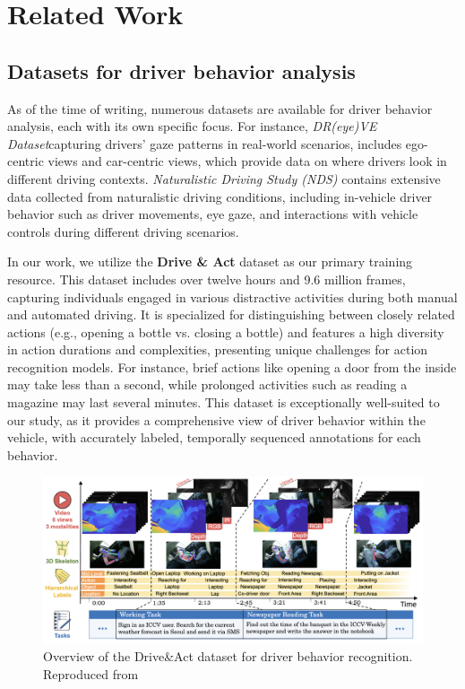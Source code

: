 \chapter{Related Work}\label{chapter:relatedwork}

\section{Datasets for driver behavior analysis}

As of the time of writing, numerous datasets are available for driver behavior analysis, each with its own specific focus. For instance, \textit{DR(eye)VE Dataset}\cite{palazzi2018predicting}capturing drivers' gaze patterns in real-world scenarios, includes ego-centric views and car-centric views, which provide data on where drivers look in different driving contexts. \textit{Naturalistic Driving Study (NDS)}\cite{regan2012naturalistic} contains extensive data collected from naturalistic driving conditions, including in-vehicle driver behavior such as driver movements, eye gaze, and interactions with vehicle controls during different driving scenarios.


In our work, we utilize the \textbf{Drive \& Act} dataset\cite{9009583} as our primary training resource. This dataset includes over twelve hours and 9.6 million frames, capturing individuals engaged in various distractive activities during both manual and automated driving. It is specialized for distinguishing between closely related actions (e.g., opening a bottle vs. closing a bottle) and features a high diversity in action durations and complexities, presenting unique challenges for action recognition models. For instance, brief actions like opening a door from the inside may take less than a second, while prolonged activities such as reading a magazine may last several minutes. This dataset is exceptionally well-suited to our study, as it provides a comprehensive view of driver behavior within the vehicle, with accurately labeled, temporally sequenced annotations for each behavior.


\begin{figure}
    \centering
    \includegraphics[width=0.8\linewidth]{figures/03_DriveAct.png}
    \caption{Overview of the Drive\&Act dataset for driver behavior recognition. Reproduced from\cite{9009583}}
    \label{fig:DriveAct}
\end{figure}

